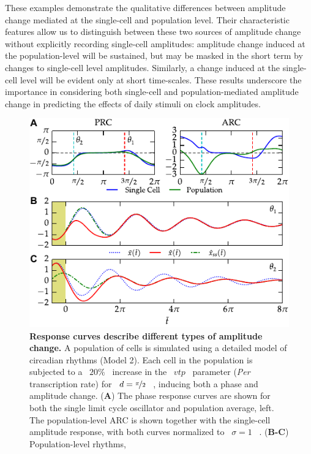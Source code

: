\documentclass[11pt, letterpaper]{article}
\providecommand{\DIFadd}[1]{{\protect\color{blue}#1}} %
\providecommand{\DIFaddFL}[1]{\DIFadd{#1}} %
\begin{document}
\DIFadd{These examples demonstrate the qualitative differences between amplitude change mediated at the single-cell and population level.
Their characteristic features allow us to distinguish between these two sources of amplitude change without explicitly recording single-cell amplitudes: amplitude change induced at the population-level will be sustained, but may be masked in the short term by changes to single-cell level amplitudes.
Similarly, a change induced at the single-cell level will be evident only at short time-scales.
These results underscore the importance in considering both single-cell and population-mediated amplitude change in predicting the effects of daily stimuli on clock amplitudes.
}

\begin{figure}[tbp]
  \begin{center}
    \includegraphics[width=.75\textwidth]{figures/figure_4.pdf}
    \caption{\DIFaddFL{
{}\bfseries \DIFaddFL{Response curves describe different types of amplitude change.}}
\DIFaddFL{A population of cells is simulated using a detailed model of circadian rhythms (Model 2).
Each cell in the population is subjected to a \mbox{%
$20\%$
}%
increase in the \mbox{%
$\mathit{vtp}$
}%
parameter (}{\itshape \DIFaddFL{Per}} \DIFaddFL{transcription rate) for \mbox{%
$d=\nicefrac{\pi}{2}$
}%
, inducing both a phase and amplitude change.
(}{\bfseries \DIFaddFL{A}}\DIFaddFL{) The phase response curves are shown for both the single limit cycle oscillator and population average, left.
The population-level ARC is shown together with the single-cell amplitude response, with both curves normalized to \mbox{%
$\sigma=1$
}%
.
(}{\bfseries \DIFaddFL{B-C}}\DIFaddFL{) Population-level rhythms, \mbox{%
}}}
\end{center}
\end{figure}
\end{document}

